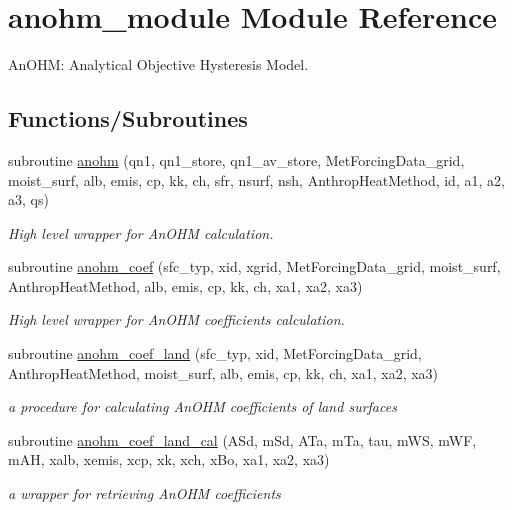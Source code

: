 \hypertarget{namespaceanohm__module}{}\section{anohm\+\_\+module Module Reference}
\label{namespaceanohm__module}


An\+O\+HM\+: Analytical Objective Hysteresis Model.  


\subsection*{Functions/\+Subroutines}
\begin{DoxyCompactItemize}
\item 
subroutine \hyperlink{namespaceanohm__module_a12150b343f1a4a8c3210e499cb9db9d9}{anohm} (qn1, qn1\+\_\+store, qn1\+\_\+av\+\_\+store, Met\+Forcing\+Data\+\_\+grid, moist\+\_\+surf, alb, emis, cp, kk, ch, sfr, nsurf, nsh, Anthrop\+Heat\+Method, id, a1, a2, a3, qs)
\begin{DoxyCompactList}\small\item\em High level wrapper for An\+O\+HM calculation. \end{DoxyCompactList}\item 
subroutine \hyperlink{namespaceanohm__module_a5aa773c6b5c4a66155eaeb1c86c70471}{anohm\+\_\+coef} (sfc\+\_\+typ, xid, xgrid, Met\+Forcing\+Data\+\_\+grid, moist\+\_\+surf, Anthrop\+Heat\+Method, alb, emis, cp, kk, ch, xa1, xa2, xa3)
\begin{DoxyCompactList}\small\item\em High level wrapper for An\+O\+HM coefficients calculation. \end{DoxyCompactList}\item 
subroutine \hyperlink{namespaceanohm__module_abe3a233f6e7d95775554ccc25e1cac45}{anohm\+\_\+coef\+\_\+land} (sfc\+\_\+typ, xid, Met\+Forcing\+Data\+\_\+grid, Anthrop\+Heat\+Method, moist\+\_\+surf, alb, emis, cp, kk, ch, xa1, xa2, xa3)
\begin{DoxyCompactList}\small\item\em a procedure for calculating An\+O\+HM coefficients of land surfaces \end{DoxyCompactList}\item 
subroutine \hyperlink{namespaceanohm__module_a20235f7bc1aada21135014d0e942e59f}{anohm\+\_\+coef\+\_\+land\+\_\+cal} (A\+Sd, m\+Sd, A\+Ta, m\+Ta, tau, m\+WS, m\+WF, m\+AH, xalb, xemis, xcp, xk, xch, x\+Bo, xa1, xa2, xa3)
\begin{DoxyCompactList}\small\item\em a wrapper for retrieving An\+O\+HM coefficients \end{DoxyCompactList}\item 

\end{DoxyCompactItemize}
